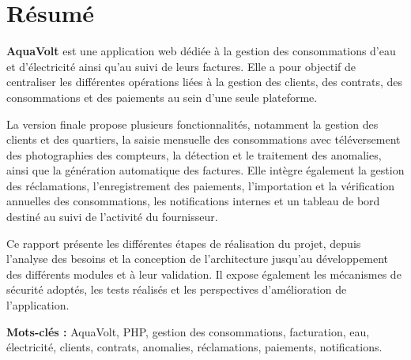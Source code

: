
\chapter*{Résumé}

\textbf{AquaVolt} est une application web dédiée à la gestion des consommations d'eau et d'électricité ainsi qu'au suivi de leurs factures. Elle a pour objectif de centraliser les différentes opérations liées à la gestion des clients, des contrats, des consommations et des paiements au sein d'une seule plateforme.

La version finale propose plusieurs fonctionnalités, notamment la gestion des clients et des quartiers, la saisie mensuelle des consommations avec téléversement des photographies des compteurs, la détection et le traitement des anomalies, ainsi que la génération automatique des factures. Elle intègre également la gestion des réclamations, l'enregistrement des paiements, l'importation et la vérification annuelles des consommations, les notifications internes et un tableau de bord destiné au suivi de l'activité du fournisseur.

Ce rapport présente les différentes étapes de réalisation du projet, depuis l'analyse des besoins et la conception de l'architecture jusqu'au développement des différents modules et à leur validation. Il expose également les mécanismes de sécurité adoptés, les tests réalisés et les perspectives d'amélioration de l'application.

\vspace{0.5cm}
\noindent\textbf{Mots-clés :} AquaVolt, PHP, gestion des consommations, facturation, eau, électricité, clients, contrats, anomalies, réclamations, paiements, notifications.
